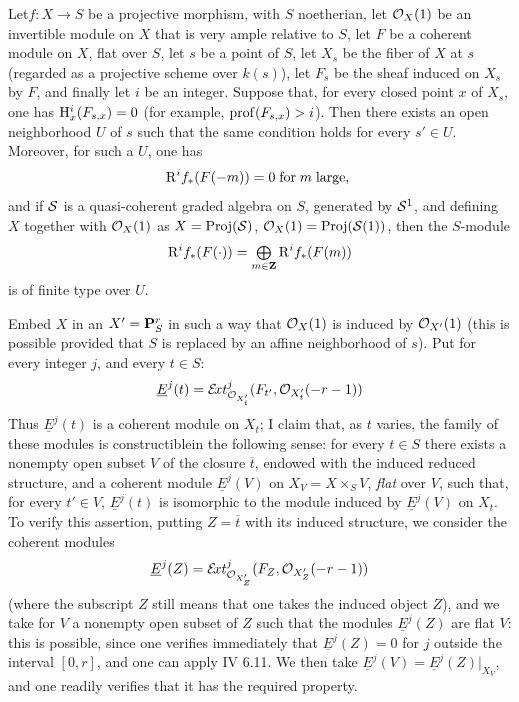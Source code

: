 \begin{proposition} \label{XII.1.5}
Let\pageoriginaled $f:X\to S$ be a projective morphism, with $S$ noetherian, let $\OX(1)$ be an invertible module on $X$ that is very ample relative to $S$, let $F$ be a coherent module on $X$, flat over $S$, let $s$ be a point of $S$, let $X_s$ be the fiber of $X$ at $s$ (regarded as a projective scheme over $k(s)$), let $F_s$ be the sheaf induced on $X_s$ by $F$, and finally let $i$ be an integer. Suppose that, for every closed point $x$ of $X_s$, one has $\H^i_x(F_{s, x})=0$ (for example, $\prof(F_{s, x})>i$). Then there exists an open neighborhood $U$ of $s$ such that the same condition holds for every $s'\in U$. Moreover, for such a $U$, one has
\[
\R^if_\ast(F(-m))= 0 \; \text{for}\; m \; \text{large, }
\]
and if $\Ss$ is a quasi-coherent graded algebra on $S$, generated by $\Ss^1$, and defining~$X$ together with $\OX(1)$ as $X=\Proj(\Ss)$, $\OX(1)=\Proj(\Ss(1))$, then the $S$-module
\[
\R^if_\ast(F(\cdot)) = \sisi{\coprod}{\tbigoplus}_{m\in\ZZ}\R^if_\ast(F(m))
\]
is of finite type over $U$.
\end{proposition}

Embed $X$ in an $X'=\PP_S^r$ in such a way that $\OX(1)$ is induced by $\Oo_{\sisi{P}{{X'}}}(1)$ (this is possible provided that $S$ is replaced by an affine neighborhood of $s$). Put\label{P5} for every integer $j$, and every $t\in S$:
\steco
\begin{equation} \label{eq:XII.7} {}\underline{E}^j(t)= \SheafExt^j_{\Oo_{X'_t}} (F_{t'}, \Oo_{X'_t}(-r-1))
\end{equation}
Thus $\underline{E}^j(t)$ is a coherent module on $X_t$; I claim that, as $t$ varies, the family of these modules is \og constructible\fg in the following sense: for every $t\in S$ there exists a nonempty open subset $V$ of the closure $\overline{t}$, endowed with the induced reduced structure, and a coherent module $\underline{E}^j(V)$ on $X_V=X\times_SV$, \emph{flat} over $V$, such that, for every $t'\in V$, $\underline{E}^j(t)$ is isomorphic to the module induced by $\underline{E}^j(V)$ on $X_t$. To verify this assertion, putting $Z=\overline{t}$ with its induced structure, we consider the coherent modules\pageoriginale
\[
\underline{E}^j(Z)= \SheafExt^j_{\Oo_{X'_Z}} (F_Z, \Oo_{X'_Z}(-r-1))
\]
(where the subscript $Z$ still means that one takes the induced object  $Z$), and we take for $V$ a nonempty open subset of $Z$ such that the modules $\underline{E}^j(Z)$ are flat  $V$: this is possible, since one verifies immediately that $\underline{E}^j(Z)=0$ for $j$ outside the interval $[0, r]$, and one can apply  IV 6.11. We then take $\underline{E}^j(V)=\underline{E}^j(Z)|_{X_V}$, and one readily verifies that it has the required property.


